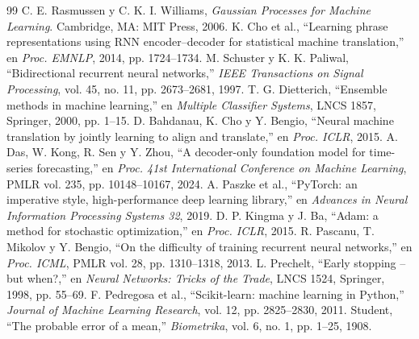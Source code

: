 \documentclass[11pt,a4paper]{article}
\begin{document}
\begin{thebibliography}{99}
 C. E. Rasmussen y C. K. I. Williams, \emph{Gaussian Processes for Machine Learning}. Cambridge, MA: MIT Press, 2006.
 K. Cho et al., ``Learning phrase representations using RNN encoder--decoder for statistical machine translation,'' en \emph{Proc. EMNLP}, 2014, pp. 1724--1734.
 M. Schuster y K. K. Paliwal, ``Bidirectional recurrent neural networks,'' \emph{IEEE Transactions on Signal Processing}, vol. 45, no. 11, pp. 2673--2681, 1997.
 T. G. Dietterich, ``Ensemble methods in machine learning,'' en \emph{Multiple Classifier Systems}, LNCS 1857, Springer, 2000, pp. 1--15.
 D. Bahdanau, K. Cho y Y. Bengio, ``Neural machine translation by jointly learning to align and translate,'' en \emph{Proc. ICLR}, 2015.
 A. Das, W. Kong, R. Sen y Y. Zhou, ``A decoder-only foundation model for time-series forecasting,'' en \emph{Proc. 41st International Conference on Machine Learning}, PMLR vol. 235, pp. 10148--10167, 2024.
 A. Paszke et al., ``PyTorch: an imperative style, high-performance deep learning library,'' en \emph{Advances in Neural Information Processing Systems 32}, 2019.
 D. P. Kingma y J. Ba, ``Adam: a method for stochastic optimization,'' en \emph{Proc. ICLR}, 2015.
 R. Pascanu, T. Mikolov y Y. Bengio, ``On the difficulty of training recurrent neural networks,'' en \emph{Proc. ICML}, PMLR vol. 28, pp. 1310--1318, 2013.
 L. Prechelt, ``Early stopping -- but when?,'' en \emph{Neural Networks: Tricks of the Trade}, LNCS 1524, Springer, 1998, pp. 55--69.
 F. Pedregosa et al., ``Scikit-learn: machine learning in Python,'' \emph{Journal of Machine Learning Research}, vol. 12, pp. 2825--2830, 2011.
 Student, ``The probable error of a mean,'' \emph{Biometrika}, vol. 6, no. 1, pp. 1--25, 1908.
\end{thebibliography}
\end{document}
